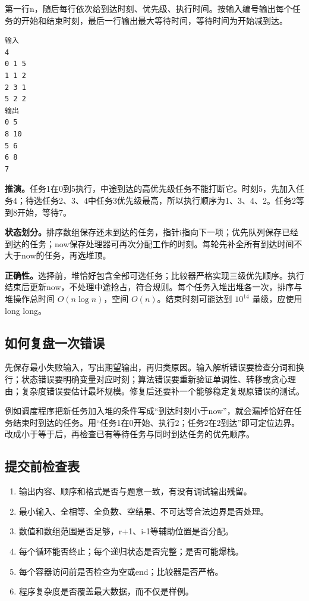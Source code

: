 第一行n，随后每行依次给到达时刻、优先级、执行时间。按输入编号输出每个任务的开始和结束时刻，最后一行输出最大等待时间，等待时间为开始减到达。
\begin{verbatim}
输入
4
0 1 5
1 1 2
2 3 1
5 2 2
输出
0 5
8 10
5 6
6 8
7
\end{verbatim}
\textbf{推演。}任务1在0到5执行，中途到达的高优先级任务不能打断它。时刻5，先加入任务4；待选任务2、3、4中任务3优先级最高，所以执行顺序为1、3、4、2。任务2等到8开始，等待7。

\textbf{状态划分。}排序数组保存还未到达的任务，指针i指向下一项；优先队列保存已经到达的任务；now保存处理器可再次分配工作的时刻。每轮先补全所有到达时间不大于now的任务，再选堆顶。

\textbf{正确性。}选择前，堆恰好包含全部可选任务；比较器严格实现三级优先顺序。执行结束后更新now，不处理中途抢占，符合规则。每个任务入堆出堆各一次，排序与堆操作总时间 $O(n\log n)$，空间 $O(n)$。结束时刻可能达到 $10^{14}$ 量级，应使用long long。

\subsection{如何复盘一次错误}
先保存最小失败输入，写出期望输出，再归类原因。输入解析错误要检查分词和换行；状态错误要明确变量对应时刻；算法错误要重新验证单调性、转移或贪心理由；复杂度错误要估计最坏规模。修复后还要补一个能够稳定复现原错误的测试。

例如调度程序把新任务加入堆的条件写成“到达时刻小于now”，就会漏掉恰好在任务结束时到达的任务。用“任务1在0开始、执行2；任务2在2到达”即可定位边界。改成小于等于后，再检查已有等待任务与同时到达任务的优先顺序。

\subsection{提交前检查表}
\begin{enumerate}
\item 输出内容、顺序和格式是否与题意一致，有没有调试输出残留。
\item 最小输入、全相等、全负数、空结果、不可达等合法边界是否处理。
\item 数值和数组范围是否足够，r+1、i-1等辅助位置是否分配。
\item 每个循环能否终止；每个递归状态是否完整；是否可能爆栈。
\item 每个容器访问前是否检查为空或end；比较器是否严格。
\item 程序复杂度是否覆盖最大数据，而不仅是样例。
\end{enumerate}
\newpage
